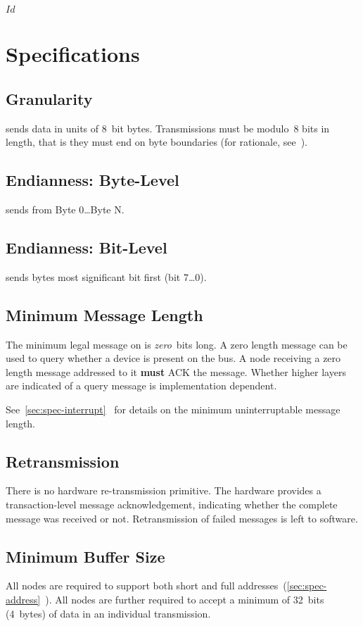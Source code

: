 \svnInfo $Id$

\section{Specifications}
\label{sec:spec}

\subsection{Granularity}
\bus sends data in units of 8~bit bytes. Transmissions must be modulo~8 bits
in length, that is they must end on byte boundaries (for rationale,
see~).

\subsection{Endianness: Byte-Level}
\bus sends from Byte 0{\ldots}Byte N.

\subsection{Endianness: Bit-Level}
\bus sends bytes most significant bit first (bit 7{\ldots}0).

\subsection{Minimum Message Length}
The minimum legal message on \bus is {\em zero}~bits long. A zero length
message can be used to query whether a device is present on the bus. A node
receiving a zero length message addressed to it {\bf must} ACK the message.
Whether higher layers are indicated of a query message is implementation
dependent.

See~\ref{sec:spec-interrupt}~ for details on the
minimum uninterruptable message length.

\subsection{Retransmission}
There is no hardware re-transmission primitive. The hardware provides a
transaction-level message acknowledgement, indicating whether the complete
message was received or not. Retransmission of failed messages is left to
software.

\subsection{Minimum Buffer Size}
All \bus nodes are required to support both short and full
addresses~(\ref{sec:spec-address}~). All \bus nodes
are further required to accept a minimum of 32~bits (4~bytes) of data in an
individual transmission.

